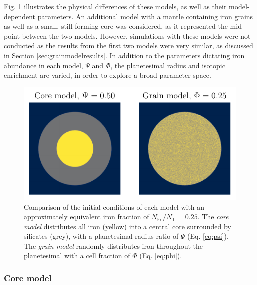 \documentclass[fleqn,usenatbib]{mnras}
\newcommand{\rms}[1]{\ensuremath{_{\text{#1}}}}
\begin{document}
\noindent 
Fig. \ref{fig:distromodels} illustrates the physical differences of these models, as well as their model-dependent parameters.
An additional model with a mantle containing iron grains as well as a small, still forming core was considered, as it represented the mid-point between the two models.
However, simulations with these models were not conducted as the results from the first two models were very similar, as discussed in Section \ref{sec:grainmodelresults}.
In addition to the parameters dictating iron abundance in each model, $\Psi$ and $\Phi$, the planetesimal radius and isotopic enrichment are varied, in order to explore a broad parameter space.

\begin{figure}
  \centering
  \includegraphics[scale=0.7]{assets/morph.pdf}
  \caption{Comparison of the initial conditions of each model with an approximately equivalent iron fraction of $N\rms{Fe}/N\rms{T} = 0.25$. The \emph{core model} distributes all iron (yellow) into a central core surrounded by silicates (grey), with a planetesimal radius ratio of $\Psi$ (Eq. \ref{eq:psi}). The \emph{grain model} randomly distributes iron throughout the planetesimal with a cell fraction of $\Phi$ (Eq. \ref{eq:phi}).}
  \label{fig:distromodels}
\end{figure}

\subsubsection{Core model} %
\label{sec:coremodel}
\end{document}
